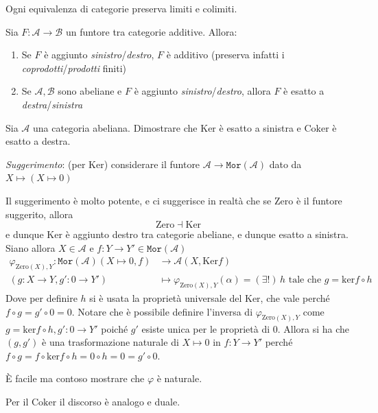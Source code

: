 \begin{corollary}{}
    Ogni equivalenza di categorie preserva limiti e colimiti.
\end{corollary}

\begin{corollary}{}
    Sia \(F : \mathcal{A} \to \mathcal{B}\) un funtore tra categorie additive.
    Allora:
\begin{enumerate}[label = \arabic*.]
    \item Se \(F\) è aggiunto \emph{sinistro}/\emph{destro}, \(F\) è additivo
        (preserva infatti i \emph{coprodotti}/\emph{prodotti} finiti)
    \item Se \(\mathcal{A}, \mathcal{B}\) sono abeliane e \(F\) è aggiunto
        \emph{sinistro}/\emph{destro}, allora \(F\) è esatto a
        \emph{destra}/\emph{sinistra}
\end{enumerate}
\end{corollary}

\begin{eser}{}
    Sia \(\mathcal{A}\) una categoria abeliana. Dimostrare che \(\mathrm{Ker}\)
    è esatto a sinistra e \(\mathrm{Coker}\) è esatto a destra.

    \emph{Suggerimento}: (per \(\mathrm{Ker}\)) considerare il funtore \(\mathcal{A} \to
    \mathtt{Mor}{(\mathcal{A})}\) dato da \(X \mapsto {(X \mapsto 0)}\) 

    \tcblower

    Il suggerimento è molto potente, e ci suggerisce in realtà che
    se \(\mathrm{Zero}\) è il funtore suggerito, allora
    \[
      \mathrm{Zero} \dashv \mathrm{Ker}
    \]
    e dunque \(\mathrm{Ker}\) è aggiunto destro tra categorie abeliane, e dunque
    esatto a sinistra. Siano allora \(X \in \mathcal{A}\) e \(f : Y \to Y' \in
    \mathtt{Mor}{(\mathcal{A})}\) 
    \begin{align*}
        \varphi_{\mathrm{Zero}{(X)}, Y} :
        \mathtt{Mor}{(\mathcal{A})}{(X \mapsto 0, f)} &\longrightarrow
        \mathcal{A}{(X, \mathrm{Ker}f)} \\
         {(g: X \to Y, g' : 0 \to Y')} &\longmapsto \varphi_{\mathrm{Zero}{(X)},
         Y} (\alpha) = {(\exists !)}\,h \text{ tale che } g = \mathrm{ker}f \circ h
    \end{align*}
    Dove per definire \(h\) si è usata la proprietà universale del
    \(\mathrm{Ker}\), che vale perché \(f \circ g = g' \circ 0 = 0\). Notare che
    è possibile definire l'inversa di \(\varphi_{\mathrm{Zero}{(X)}, Y} \) come
    \(g = \mathrm{ker}f \circ h, g' : 0 \to Y'\) poiché \(g'\) esiste unica
    per le proprietà di 0. Allora si ha che \({(g, g')}\) è una trasformazione
    naturale di \(X \mapsto 0\) in \(f : Y \to Y'\) perché \(f \circ g = f \circ
    \mathrm{ker}f \circ h = 0 \circ h = 0 = g' \circ 0\).

    È facile ma contoso mostrare che \(\varphi \) è naturale.

    Per il \(\mathrm{Coker}\) il discorso è analogo e duale.
\end{eser}

